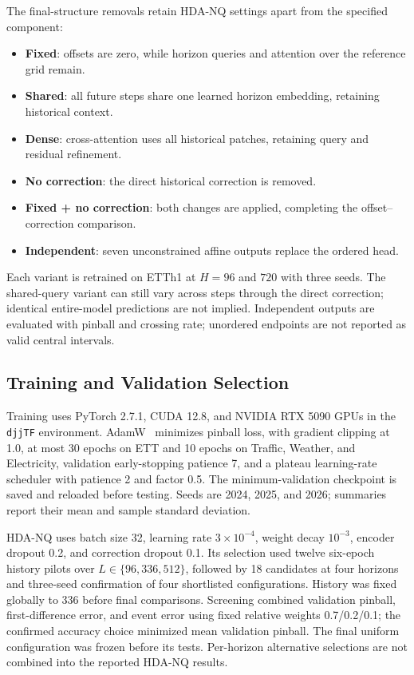 The final-structure removals retain HDA-NQ settings apart from the specified component:
\begin{itemize}
\item \textbf{Fixed}: offsets are zero, while horizon queries and attention over the reference grid remain.
\item \textbf{Shared}: all future steps share one learned horizon embedding, retaining historical context.
\item \textbf{Dense}: cross-attention uses all historical patches, retaining query and residual refinement.
\item \textbf{No correction}: the direct historical correction is removed.
\item \textbf{Fixed + no correction}: both changes are applied, completing the offset--correction comparison.
\item \textbf{Independent}: seven unconstrained affine outputs replace the ordered head.
\end{itemize}
Each variant is retrained on ETTh1 at $H=96$ and $720$ with three seeds. The shared-query variant can still vary across steps through the direct correction; identical entire-model predictions are not implied. Independent outputs are evaluated with pinball and crossing rate; unordered endpoints are not reported as valid central intervals.

\subsection{Training and Validation Selection}
Training uses PyTorch 2.7.1, CUDA 12.8, and NVIDIA RTX 5090 GPUs in the \texttt{djjTF} environment. AdamW~\cite{loshchilov2019adamw} minimizes pinball loss, with gradient clipping at 1.0, at most 30 epochs on ETT and 10 epochs on Traffic, Weather, and Electricity, validation early-stopping patience 7, and a plateau learning-rate scheduler with patience 2 and factor 0.5. The minimum-validation checkpoint is saved and reloaded before testing. Seeds are 2024, 2025, and 2026; summaries report their mean and sample standard deviation.

HDA-NQ uses batch size 32, learning rate $3\times10^{-4}$, weight decay $10^{-3}$, encoder dropout 0.2, and correction dropout 0.1. Its selection used twelve six-epoch history pilots over $L\in\{96,336,512\}$, followed by 18 candidates at four horizons and three-seed confirmation of four shortlisted configurations. History was fixed globally to 336 before final comparisons. Screening combined validation pinball, first-difference error, and event error using fixed relative weights 0.7/0.2/0.1; the confirmed accuracy choice minimized mean validation pinball. The final uniform configuration was frozen before its tests. Per-horizon alternative selections are not combined into the reported HDA-NQ results.

